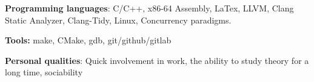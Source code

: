 \textbf{Programming languages}: C/C++, x86-64 Assembly, LaTex, LLVM, Clang Static Analyzer, Clang-Tidy, Linux, Concurrency paradigms.

\textbf{Tools:} make, CMake, gdb, git/github/gitlab

\textbf{Personal qualities}: Quick involvement in work, the ability to study theory for a long time, sociability